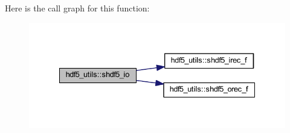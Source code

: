 Here is the call graph for this function\+:\nopagebreak
\begin{figure}[H]
\begin{center}
\leavevmode
\includegraphics[width=335pt]{namespacehdf5__utils_ab16be1368bf81b1ead660310e178c07e_cgraph}
\end{center}
\end{figure}


